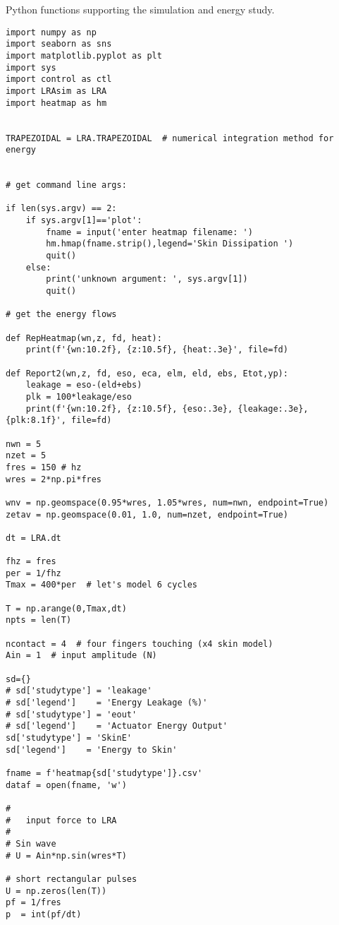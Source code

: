 \clearpage
\newpage
\begin{listing}[h]
    \caption{Python functions supporting the simulation and energy study.}\label{Listing1}
\end{listing}
\begin{verbatim}
import numpy as np
import seaborn as sns
import matplotlib.pyplot as plt
import sys
import control as ctl
import LRAsim as LRA
import heatmap as hm


TRAPEZOIDAL = LRA.TRAPEZOIDAL  # numerical integration method for energy


# get command line args:

if len(sys.argv) == 2:
    if sys.argv[1]=='plot':
        fname = input('enter heatmap filename: ')
        hm.hmap(fname.strip(),legend='Skin Dissipation ')
        quit()
    else:
        print('unknown argument: ', sys.argv[1])
        quit()

# get the energy flows

def RepHeatmap(wn,z, fd, heat):
    print(f'{wn:10.2f}, {z:10.5f}, {heat:.3e}', file=fd)

def Report2(wn,z, fd, eso, eca, elm, eld, ebs, Etot,yp):
    leakage = eso-(eld+ebs)
    plk = 100*leakage/eso
    print(f'{wn:10.2f}, {z:10.5f}, {eso:.3e}, {leakage:.3e}, {plk:8.1f}', file=fd)

nwn = 5
nzet = 5
fres = 150 # hz
wres = 2*np.pi*fres

wnv = np.geomspace(0.95*wres, 1.05*wres, num=nwn, endpoint=True)
zetav = np.geomspace(0.01, 1.0, num=nzet, endpoint=True)

dt = LRA.dt

fhz = fres
per = 1/fhz
Tmax = 400*per  # let's model 6 cycles

T = np.arange(0,Tmax,dt)
npts = len(T)

ncontact = 4  # four fingers touching (x4 skin model)
Ain = 1  # input amplitude (N)

sd={}
# sd['studytype'] = 'leakage'
# sd['legend']    = 'Energy Leakage (%)'
# sd['studytype'] = 'eout'
# sd['legend']    = 'Actuator Energy Output'
sd['studytype'] = 'SkinE'
sd['legend']    = 'Energy to Skin'

fname = f'heatmap{sd['studytype']}.csv'
dataf = open(fname, 'w')

#
#   input force to LRA
#
# Sin wave
# U = Ain*np.sin(wres*T)

# short rectangular pulses
U = np.zeros(len(T))
pf = 1/fres
p  = int(pf/dt)


\end{verbatim}
